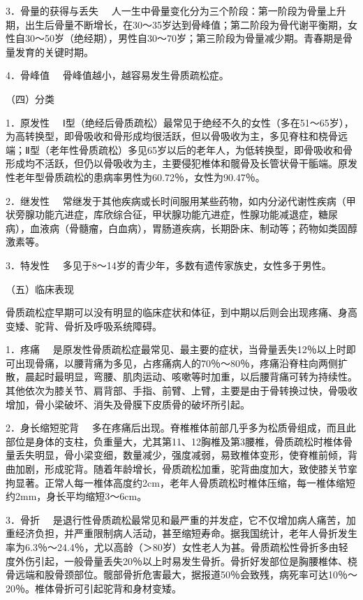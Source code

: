 {3．骨量的获得与丢失}
　人一生中骨量变化分为三个阶段：第一阶段为骨量上升期，出生后骨量不断增长，在30～35岁达到骨峰值；第二阶段为骨代谢平衡期，女性自30～50岁（绝经期），男性自30～70岁；第三阶段为骨量减少期。青春期是骨量发育的关键时期。

{4．骨峰值} 　骨峰值越小，越容易发生骨质疏松症。

（四）分类

{1．原发性}
　Ⅰ型（绝经后骨质疏松）最常见于绝经不久的女性（多在51～65岁），为高转换型，即骨吸收和骨形成均很活跃，但以骨吸收为主，多见脊柱和桡骨远端；Ⅱ型（老年性骨质疏松）多见65岁以后的老年人，为低转换型，即骨吸收和骨形成均不活跃，但仍以骨吸收为主，主要侵犯椎体和髋骨及长管状骨干骺端。原发性老年型骨质疏松的患病率男性为60.72％，女性为90.47％。

{2．继发性}
　常继发于其他疾病或长时间服用某些药物，如内分泌代谢性疾病（甲状旁腺功能亢进症，库欣综合征，甲状腺功能亢进症，性腺功能减退症，糖尿病），血液病（骨髓瘤，白血病），胃肠道疾病，长期卧床、制动等；药物如类固醇激素等。

{3．特发性} 　多见于8～14岁的青少年，多数有遗传家族史，女性多于男性。

（五）临床表现

骨质疏松症早期可以没有明显的临床症状和体征，到中期以后则会出现疼痛、身高变矮、驼背、骨折及呼吸系统障碍。

{1．疼痛}
　是原发性骨质疏松症最常见、最主要的症状，当骨量丢失12％以上时即可出现骨痛，以腰背痛为多见，占疼痛病人的70％～80％，疼痛沿脊柱向两侧扩散，晨起时最明显，弯腰、肌肉运动、咳嗽等时加重，以后腰背痛可转为持续性。其他依次为膝关节、肩背部、手指、前臂、上臂，主要是由于骨转换过快，骨吸收增加，骨小梁破坏、消失及骨膜下皮质骨的破坏所引起。

{2．身长缩短驼背}
　多在疼痛后出现。脊椎椎体前部几乎多为松质骨组成，而且此部位是身体的支柱，负重量大，尤其第11、12胸椎及第3腰椎，骨质疏松时椎体骨量丢失明显，骨小梁变细，数量减少，强度减弱，易致椎体变形，使脊椎前倾，背曲加剧，形成驼背。随着年龄增长，骨质疏松加重，驼背曲度加大，致使膝关节挛拘显著。正常人每一椎体高度约2cm，老年人骨质疏松时椎体压缩，每一椎体缩短约2mm，身长平均缩短3～6cm。

{3．骨折}
　是退行性骨质疏松最常见和最严重的并发症，它不仅增加病人痛苦，加重经济负担，并严重限制病人活动，甚至缩短寿命。据我国统计，老年人骨折发生率为6.3％～24.4％，尤以高龄（＞80岁）女性老人为甚。骨质疏松性骨折多由轻度外伤引起，一般骨量丢失20％以上时易发生骨折。骨折好发部位是胸腰椎体、桡骨远端和股骨颈部位。髋部骨折危害最大，据报道50％会致残，病死率可达10％～20％。椎体骨折可引起驼背和身材变矮。

